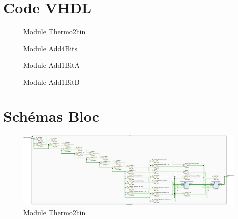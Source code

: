 \newpage
\appendix


\section{Code VHDL}

\begin{figure}[H]
	\tiny
	\centering
	\begin{varwidth}{\linewidth}
		
	\end{varwidth}
	\caption{Module Thermo2bin}
\end{figure}

\begin{figure}[H]
	\tiny
	\centering
	\begin{varwidth}{\linewidth}
		
	\end{varwidth}
	\caption{Module Add4Bits}
\end{figure}

\begin{figure}[H]
	\tiny
	\centering
	\begin{varwidth}{\linewidth}
		
	\end{varwidth}
	\caption{Module Add1BitA}
\end{figure}

\begin{figure}[H]
	\tiny
	\centering
	\begin{varwidth}{\linewidth}
		
	\end{varwidth}
	\caption{Module Add1BitB}
\end{figure}

\section{Schémas Bloc}

\begin{figure}[H]
	\centering
	\includegraphics[width=\textwidth]{assets/img/schematic-thermo2bin.png}
	\caption{Module Thermo2bin}
\end{figure}

